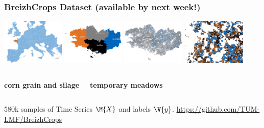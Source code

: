 
\begin{frame}
\frametitle{BreizhCrops Dataset (available by next week!)}

\includegraphics[width=3cm]{images/map/europe}
\includegraphics[width=3cm]{images/map/regions}
\includegraphics[width=3cm]{images/map/breizh}
\includegraphics[width=3cm]{images/map/parcels}

\vspace{1em}


\begin{columns}
	
	\textbf{corn grain and silage}
	
	
	\textbf{temporary meadows}
	
\end{columns}

\vspace{1em}

\Large
580k samples of Time Series $\M{X}$ and labels $\V{y}$. \Large \url{https://github.com/TUM-LMF/BreizhCrops}

\end{frame}


